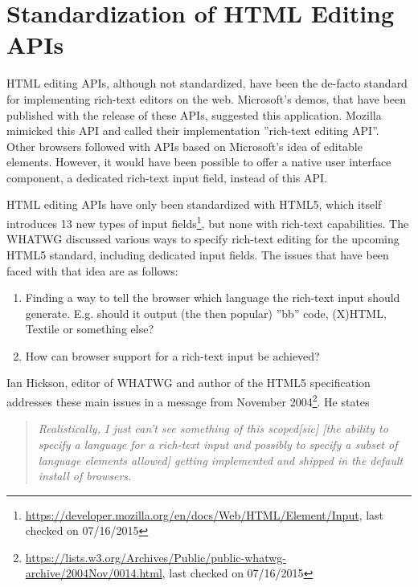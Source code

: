 
\section{Standardization of HTML Editing APIs}
\label{sec:standardization-of-html-editing-apis}


HTML editing APIs, although not standardized, have been the de-facto standard for implementing rich-text editors on the web. Microsoft's demos, that have been published with the release of these APIs, suggested this application. Mozilla mimicked this API and called their implementation ''rich-text editing API''. Other browsers followed with APIs based on Microsoft's idea of editable elements. However, it would have been possible to offer a native user interface component, a dedicated rich-text input field, instead of this API.

HTML editing APIs have only been standardized with HTML5, which itself introduces 13 new types of input fields\footnote{\url{https://developer.mozilla.org/en/docs/Web/HTML/Element/Input}, last checked on 07/16/2015}, but none with rich-text capabilities. The WHATWG discussed various ways to specify rich-text editing for the upcoming HTML5 standard, including dedicated input fields. The issues that have been faced with that idea are as follows:

\begin{enumerate} 
\item Finding a way to tell the browser which language the rich-text input should generate. E.g. should it output (the then popular) ''bb'' code, (X)HTML, Textile or something else?
\item How can browser support for a rich-text input be achieved?
\end{enumerate}


Ian Hickson, editor of WHATWG and author of the HTML5 specification addresses these main issues in a message from November 2004\footnote{\url{https://lists.w3.org/Archives/Public/public-whatwg-archive/2004Nov/0014.html}, last checked on 07/16/2015}. He states

\begin{quotation}
\textit{Realistically, I just can't see something of this scoped[sic] [the ability to specify a language for a rich-text input and possibly to specify a subset of language elements allowed] getting implemented and shipped in the default install of browsers.}
\end{quotation}

